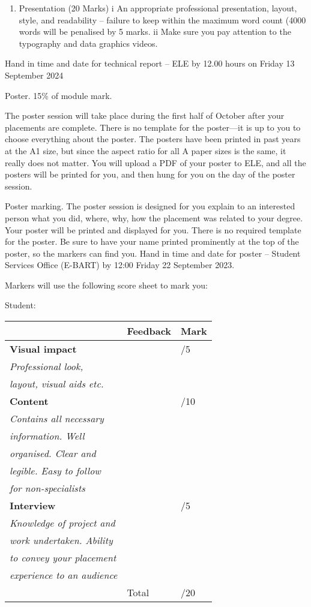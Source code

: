 \documentclass[11pt]{article}
\begin{document}
\begin{enumerate}
\item Presentation (20 Marks)
i  An appropriate professional presentation, layout, style, and readability – failure to keep within the maximum word count (4000 words will be penalised by 5 marks.
ii Make sure you pay attention to the typography and data graphics videos.
\end{enumerate}

Hand in time and date for technical report – ELE by 12.00 hours on Friday 13 September 2024

Poster. 15\% of module mark.

The poster session will take place during the first half of October after your placements are
complete.
There is no template for the poster—it is up to you to choose everything about the poster.
The posters have been printed in past years at the A1 size, but since the aspect ratio for all A
paper sizes is the same, it really does not matter. You will upload a PDF of your poster to
ELE, and all the posters will be printed for you, and then hung for you on the day of the
poster session.

Poster marking. The poster session is designed for you explain to an interested person what
you did, where, why, how the placement was related to your degree. Your poster will be
printed and displayed for you. There is no required template for the poster. Be sure to have
your name printed prominently at the top of the poster, so the markers can find you.
Hand in time and date for poster – Student Services Office (E-BART) by 12:00 Friday 22
September 2023.

Markers will use the following score sheet to mark you:

Student:

\begin{center}
\begin{tabular}{lll}
 & Feedback & Mark\\[0pt]
\hline
\textbf{Visual impact} &  & /5\\[0pt]
\emph{Professional look,} &  & \\[0pt]
\emph{layout, visual aids etc.} &  & \\[0pt]
\hline
\textbf{Content} &  & /10\\[0pt]
\emph{Contains all necessary} &  & \\[0pt]
\emph{information. Well} &  & \\[0pt]
\emph{organised. Clear and} &  & \\[0pt]
\emph{legible. Easy to follow} &  & \\[0pt]
\emph{for non-specialists} &  & \\[0pt]
\hline
\textbf{Interview} &  & /5\\[0pt]
\emph{Knowledge of project and} &  & \\[0pt]
\emph{work undertaken. Ability} &  & \\[0pt]
\emph{to convey  your placement} &  & \\[0pt]
\emph{experience to an audience} &  & \\[0pt]
\hline
 & Total & /20\\[0pt]
\end{tabular}
\end{center}
\end{document}
